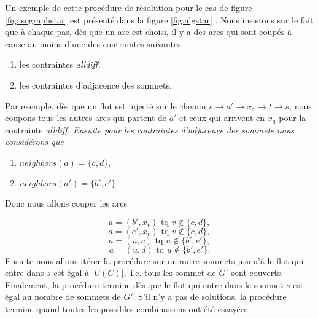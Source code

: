 \documentclass[french]{article}
\theoremstyle{definition}
\theoremstyle{remark}
\begin{document}
Un exemple de cette procédure de résolution pour le cas de figure \ref{fig:isographstar} est présenté dans la figure \ref{fig:algstar} . Nous insistons sur le fait que à chaque pas, dès que un arc est choisi, il y a des arcs qui sont coupés à cause au moins d'une des contraintes suivantes:
\begin{enumerate}
	\item les contraintes \it alldiff, \rm
	\item les contraintes d'adjacence des sommets.
\end{enumerate}
Par exemple, dès que un flot est injecté sur le chemin $s \rightarrow a' \rightarrow x_a \rightarrow t \rightarrow s$, nous coupons tous les autres arcs qui partent de $a'$ et ceux qui arrivent en $x_a$ pour la contrainte \it alldiff. \rm Ensuite pour les contraintes d'adjacence des sommets nous considérons que
\begin{enumerate}
	\item $neighbors(a)=\{c, d\},$
	\item $neighbors(a')=\{b', e'\}.$
\end{enumerate}
Donc nous allons couper les arcs

$$ a=(b', x_v) \text{ tq } v \notin \{c,d\} , $$
$$ a=(e', x_v) \text{ tq } v \notin \{c,d\}, $$
$$ a=(u, c) \text{ tq } u \notin \{b',e'\}, $$
$$ a=(u, d) \text{ tq } u \notin \{b',e'\}. $$
Ensuite nous allons itérer la procédure sur un autre sommets jusqu'à le flot qui entre dans $s$ est égal à $|U(C)|,$ i.e. tous les sommet de $G'$ sont couverts. Finalement, la procédure termine dès que le flot qui entre dans le sommet $s$ est égal au nombre de sommets de $G'$. S'il n'y a pas de solutions, la procédure termine quand toutes les possibles combinaisons ont été essayées.
\end{document}

